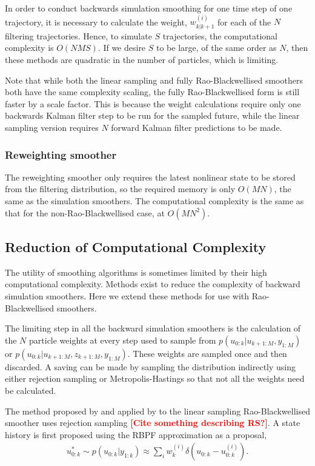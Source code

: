 \documentclass[twocolumn]{autart}    %
\newcommand{\comment}[1]{\textcolor{red}{\textbf{[#1]}}}
\begin{document}
In order to conduct backwards simulation smoothing for one time step of one trajectory, it is necessary to calculate the weight, $w_{k|k+1}^{(i)}$ for each of the $N$ filtering trajectories. Hence, to simulate $S$ trajectories, the computational complexity is $O(NMS)$. If we desire $S$ to be large, of the same order as $N$, then these methods are quadratic in the number of particles, which is limiting.

Note that while both the linear sampling and fully Rao-Blackwellised smoothers both have the same complexity scaling, the fully Rao-Blackwellised form is still faster by a scale factor. This is because the weight calculations require only one backwards Kalman filter step to be run for the sampled future, while the linear sampling version requires $N$ forward Kalman filter predictions to be made.



\subsubsection{Reweighting smoother}

The reweighting smoother only requires the latest nonlinear state to be stored from the filtering distribution, so the required memory is only $O(MN)$, the same as the simulation smoothers. The computational complexity is the same as that for the non-Rao-Blackwellised case, at $O(MN^2)$.



\subsection{Reduction of Computational Complexity}

The utility of smoothing algorithms is sometimes limited by their high computational complexity. Methods exist to reduce the complexity of backward simulation smoothers. Here we extend these methods for use with Rao-Blackwellised smoothers.

The limiting step in all the backward simulation smoothers is the calculation of the $N$ particle weights at every step used to sample from $p(u_{0:k}|u_{k+1:M}, y_{1:M})$ or $p(u_{0:k}|u_{k+1:M}, z_{k+1:M}, y_{1:M})$. These weights are sampled once and then discarded. A saving can be made by sampling the distribution indirectly using either rejection sampling or Metropolis-Hastings so that not all the weights need be calculated.

The method proposed by \cite{Douc+Garivier+Moulines+Olsson:2010} and applied by \cite{Lindsten+Schon:2011} to the linear sampling Rao-Blackwellised smoother uses rejection sampling \comment{Cite something describing RS?}. A state history is first proposed using the RBPF approximation as a proposal,
%
\begin{equation}
\begin{split}
  u_{0:k}^* \sim p(u_{0:k} | y_{1:k}) \approx \sum_i w_k^{(i)} \delta( u_{0:k} - u_{0:k}^{(i)} )     .
\end{split}
\end{equation}
\end{document}
